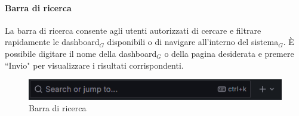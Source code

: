\documentclass[10pt]{article}
\begin{document}
\begin{justify}
    \paragraph{Barra di ricerca}
    La barra di ricerca consente agli utenti autorizzati di cercare e filtrare rapidamente le dashboard$_G$ disponibili o di navigare all'interno del sistema$_G$. È possibile digitare il nome della dashboard$_G$ o della pagina desiderata e premere ``Invio" per visualizzare i risultati corrispondenti.
    \begin{figure}[H]
    \centering
    \includegraphics[width=0.6\linewidth]{ricerca.png}
    \caption{Barra di ricerca}
    \end{figure}


\end{justify}
\end{document}
